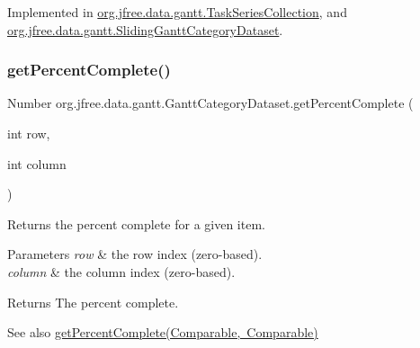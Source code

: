 Implemented in \mbox{\hyperlink{classorg_1_1jfree_1_1data_1_1gantt_1_1_task_series_collection_aeedad40761eb5414845f7e9d56b7fcb6}{org.\+jfree.\+data.\+gantt.\+Task\+Series\+Collection}}, and \mbox{\hyperlink{classorg_1_1jfree_1_1data_1_1gantt_1_1_sliding_gantt_category_dataset_a9a422df19aea47476fa3fae81a836eb1}{org.\+jfree.\+data.\+gantt.\+Sliding\+Gantt\+Category\+Dataset}}.

\mbox{\label{interfaceorg_1_1jfree_1_1data_1_1gantt_1_1_gantt_category_dataset_a92688e6bd8e5eb38b2c78888c21c8a2f}} 
\subsubsection{\texorpdfstring{get\+Percent\+Complete()}{getPercentComplete()}\hspace{0.1cm}{\footnotesize\ttfamily [1/4]}}
{\footnotesize\ttfamily Number org.\+jfree.\+data.\+gantt.\+Gantt\+Category\+Dataset.\+get\+Percent\+Complete (\begin{DoxyParamCaption}\item[{int}]{row,  }\item[{int}]{column }\end{DoxyParamCaption})}

Returns the percent complete for a given item.


\begin{DoxyParams}{Parameters}
{\em row} & the row index (zero-\/based). \\
\hline
{\em column} & the column index (zero-\/based).\\
\hline
\end{DoxyParams}
\begin{DoxyReturn}{Returns}
The percent complete.
\end{DoxyReturn}
\begin{DoxySeeAlso}{See also}
\mbox{\hyperlink{interfaceorg_1_1jfree_1_1data_1_1gantt_1_1_gantt_category_dataset_aa5ddb721d32f80a587877db94589b9fd}{get\+Percent\+Complete(\+Comparable, Comparable)}} 
\end{DoxySeeAlso}


